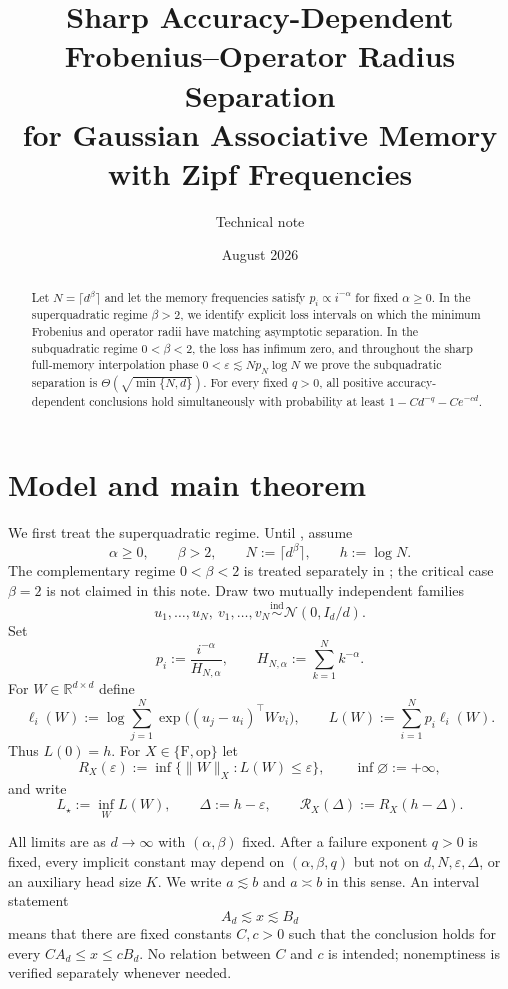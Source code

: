 \documentclass[11pt]{article}
\title{Sharp Accuracy-Dependent Frobenius--Operator Radius Separation\\
for Gaussian Associative Memory with Zipf Frequencies}
\author{Technical note}
\date{August 2026}
\theoremstyle{definition}
\newcommand{\R}{\mathbb R}
\newcommand{\cN}{\mathcal N}
\newcommand{\Id}{I}
\newcommand{\eps}{\varepsilon}
\begin{document}
\maketitle

\begin{abstract}
Let $N=\lceil d^\beta\rceil$ and let the memory frequencies satisfy
$p_i\propto i^{-\alpha}$ for fixed $\alpha\geq0$.  In the
superquadratic regime $\beta>2$, we identify explicit loss intervals on
which the minimum Frobenius and operator radii have matching asymptotic
separation.  In the subquadratic regime $0<\beta<2$, the loss has
infimum zero, and throughout the sharp full-memory interpolation phase
$0<\eps\lesssim Np_N\log N$ we prove the subquadratic separation is $\Theta(\sqrt{\min\{N,d\}})$.  For every fixed $q>0$, all positive
accuracy-dependent conclusions hold simultaneously with probability at
least $1-Cd^{-q}-Ce^{-cd}$.
\end{abstract}

\section{Model and main theorem}

We first treat the superquadratic regime.  Until
, assume
\[
 \alpha\geq0,\qquad \beta>2,\qquad
 N:=\lceil d^\beta\rceil,\qquad h:=\log N.
\]
The complementary regime $0<\beta<2$ is treated separately in
; the critical case $\beta=2$ is not claimed in
this note.  Draw two mutually independent families
\[
 u_1,\ldots,u_N,\ v_1,\ldots,v_N
 \overset{\mathrm{ind}}{\sim}\cN(0,\Id_d/d).
\]
Set
\[
 p_i:=\frac{i^{-\alpha}}{H_{N,\alpha}},
 \qquad H_{N,\alpha}:=\sum_{k=1}^N k^{-\alpha}.
\]
For $W\in\R^{d\times d}$ define
\[
 \ell_i(W):=
 \log\sum_{j=1}^N
 \exp\!\bigl((u_j-u_i)^\top Wv_i\bigr),
 \qquad
 L(W):=\sum_{i=1}^N p_i\ell_i(W).
\]
Thus $L(0)=h$.  For $X\in\{\mathrm F,\mathrm{op}\}$ let
\[
 R_X(\eps):=\inf\{\|W\|_X:L(W)\leq\eps\},
 \qquad \inf\varnothing:=+\infty,
\]
and write
\[
 L_\star:=\inf_W L(W),\qquad
 \Delta:=h-\eps,\qquad
 \mathcal R_X(\Delta):=R_X(h-\Delta).
\]

All limits are as $d\to\infty$ with $(\alpha,\beta)$ fixed.  After a
failure exponent $q>0$ is fixed, every implicit constant may depend on
$(\alpha,\beta,q)$ but not on $d,N,\eps,\Delta$, or an auxiliary head
size $K$.  We write $a\lesssim b$ and $a\asymp b$ in this sense.  An
interval statement
\[
 A_d\lesssim x\lesssim B_d
\]
means that there are fixed constants $C,c>0$ such that the conclusion
holds for every $CA_d\leq x\leq cB_d$.  No relation between $C$ and $c$
is intended; nonemptiness is verified separately whenever needed.
\end{document}
